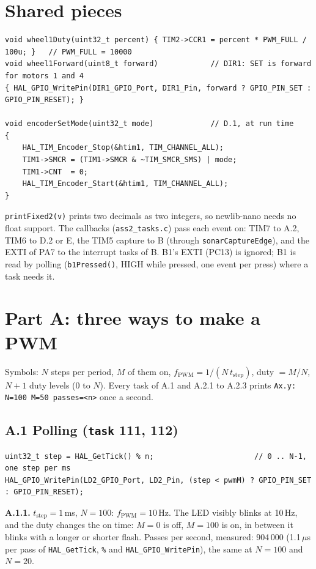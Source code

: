 \documentclass[11pt,a4paper]{article}
\newcommand{\lv}[1]{\texttt{#1}}                 %
\begin{document}
\section{Shared pieces}
\begin{lstlisting}
void wheel1Duty(uint32_t percent) { TIM2->CCR1 = percent * PWM_FULL / 100u; }   // PWM_FULL = 10000
void wheel1Forward(uint8_t forward)            // DIR1: SET is forward for motors 1 and 4
{ HAL_GPIO_WritePin(DIR1_GPIO_Port, DIR1_Pin, forward ? GPIO_PIN_SET : GPIO_PIN_RESET); }

void encoderSetMode(uint32_t mode)             // D.1, at run time
{
    HAL_TIM_Encoder_Stop(&htim1, TIM_CHANNEL_ALL);
    TIM1->SMCR = (TIM1->SMCR & ~TIM_SMCR_SMS) | mode;
    TIM1->CNT  = 0;
    HAL_TIM_Encoder_Start(&htim1, TIM_CHANNEL_ALL);
}
\end{lstlisting}
\texttt{printFixed2(v)} prints two decimals as two integers, so newlib-nano needs no float support. The callbacks
(\texttt{ass2\_tasks.c}) pass each event on: TIM7 to A.2, TIM6 to D.2 or E, the TIM5 capture to B (through
\texttt{sonarCaptureEdge}), and the EXTI of PA7 to the interrupt tasks of B. B1's EXTI (PC13) is ignored; B1 is read
by polling (\texttt{b1Pressed()}, HIGH while pressed, one event per press) where a task needs it.

\section{Part A: three ways to make a PWM}
Symbols: $N$ steps per period, $M$ of them on, $f_\mathrm{PWM} = 1/(N\,t_\mathrm{step})$, duty $= M/N$, $N + 1$ duty
levels (0 to $N$). Every task of A.1 and A.2.1 to A.2.3 prints \texttt{Ax.y: N=100 M=50 passes=<n>} once a second.

\subsection*{A.1 Polling (\lv{task} 111, 112)}
\begin{lstlisting}
uint32_t step = HAL_GetTick() % n;                       // 0 .. N-1, one step per ms
HAL_GPIO_WritePin(LD2_GPIO_Port, LD2_Pin, (step < pwmM) ? GPIO_PIN_SET : GPIO_PIN_RESET);
\end{lstlisting}
\textbf{A.1.1.} $t_\mathrm{step} = 1$\,ms, $N = 100$: $f_\mathrm{PWM} = 10$\,Hz. The LED visibly blinks at 10\,Hz,
and the duty changes the on time: $M = 0$ is off, $M = 100$ is on, in between it blinks with a longer or shorter
flash. Passes per second, measured: 904\,000 (1.1\,$\mu$s per pass of \texttt{HAL\_GetTick}, \texttt{\%} and
\texttt{HAL\_GPIO\_WritePin}), the same at $N = 100$ and $N = 20$.
\end{document}
